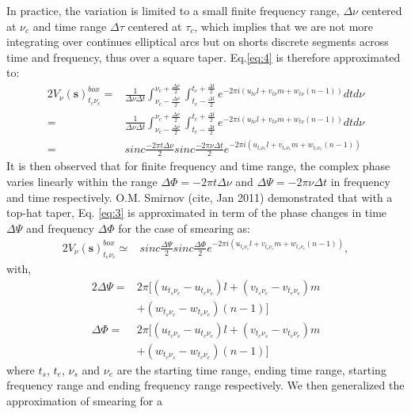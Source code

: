 In practice, the variation is limited to a small finite frequency range, $\Delta \nu$ centered at $\nu_c$ and time range $\Delta \tau$ centered
at $\tau_c$, which implies that we are not more integrating over continues elliptical arcs but on shorts discrete
segments across time and frequency, thus over a square taper. Eq.\ref{eq:4} is therefore approximated to:
\begin{alignat}{2}
V_{\nu}(\mathbf{s})^{box}_{t_c \nu_c} =& \frac{1}{\Delta \nu \Delta t}\int_{\nu_c - \frac{\Delta \nu}{2}}^{\nu_c + \frac{\Delta \nu}{2}}\int_{t_c - \frac{\Delta t}{2}}^{t_c + \frac{\Delta t}{2}}
 e^{-2\pi i (u_{t\nu}l+v_{t\nu}m+w_{t\nu}(n-1))}dt d\nu\\
					 =& \frac{1}{\Delta \nu \Delta t}\int_{\nu_c - \frac{\Delta \nu}{2}}^{\nu_c + \frac{\Delta \nu}{2}}\int_{t_c - \frac{\Delta t}{2}}^{t_c + \frac{\Delta t}{2}}
e^{-2\pi i (u_{t\nu}l+v_{t\nu}m+w_{t\nu}(n-1))} dt d\nu\\
					 =&sinc\frac{-2\pi t\Delta \nu}{2}sinc\frac{-2\pi\nu\Delta t}{2}e^{-2\pi i (u_{t_c\nu_c}l+v_{t_c\nu_c}m+w_{t_c\nu_c}(n-1))}\label{eq:5}
\end{alignat}
It is then observed that for finite frequency and time range, the complex phase varies linearly within the range
$\Delta \Phi = −2\pi t\Delta \nu$ and $\Delta \Psi= −2\pi\nu\Delta t$ in frequency and time respectively.
O.M. Smirnov (cite, Jan 2011) demonstrated that with a top-hat taper, Eq. \ref{eq:3} is approximated in term of the
phase changes in time $\Delta \Psi$ and frequency  $\Delta \Phi$ for the case
of smearing as:
\begin{alignat}{2}
V_{\nu}(\mathbf{s})^{box}_{t_c \nu_c} \simeq &  sinc\frac{\Delta \Psi}{2}sinc\frac{\Delta \Phi}{2}e^{-2\pi i (u_{t_c\nu_c}l+v_{t_c\nu_c}m+w_{t_c\nu_c}(n-1))}\label{eq:6},
\end{alignat}
with,
\begin{alignat*}{2}
\Delta \Psi =&2\pi \Big[(u_{t_s\nu_c}-u_{t_e\nu_c})l + (v_{t_s\nu_c}-v_{t_e\nu_c})m\\
	    & +(w_{t_s\nu_c}-w_{t_e\nu_c})(n-1)\Big]\\
\Delta \Phi =&2\pi \Big[(u_{t_c\nu_s}-u_{t_c\nu_e})l + (v_{t_c\nu_s}-v_{t_c\nu_e})m\\
	    & +(w_{t_c\nu_s}-w_{t_c\nu_e})(n-1)\Big]
\end{alignat*}
where $t_s$, $t_e$, $\nu_s$ and $\nu_e$ are the starting time range, ending time range, starting frequency range and ending frequency
range respectively.
We then generalized the approximation of smearing for a
